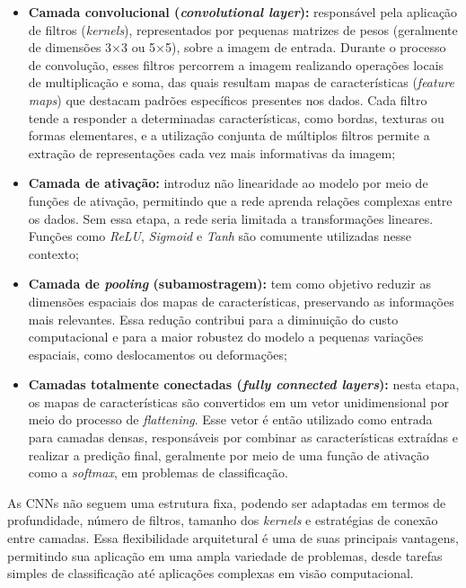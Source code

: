 \begin{itemize}
    
    \item \textbf{Camada convolucional (\textit{convolutional layer}):} responsável pela aplicação de filtros (\textit{kernels}), representados por pequenas matrizes de pesos (geralmente de dimensões 3×3 ou 5×5), sobre a imagem de entrada. Durante o processo de convolução, esses filtros percorrem a imagem realizando operações locais de multiplicação e soma, das quais resultam mapas de características (\textit{feature maps}) que destacam padrões específicos presentes nos dados. Cada filtro tende a responder a determinadas características, como bordas, texturas ou formas elementares, e a utilização conjunta de múltiplos filtros permite a extração de representações cada vez mais informativas da imagem;
    
    \item \textbf{Camada de ativação:} introduz não linearidade ao modelo por meio de funções de ativação, permitindo que a rede aprenda relações complexas entre os dados. Sem essa etapa, a rede seria limitada a transformações lineares. Funções como \textit{\acs{ReLU}}, \textit{Sigmoid} e \textit{Tanh} são comumente utilizadas nesse contexto;
    
    \item \textbf{Camada de \textit{pooling} (subamostragem):} tem como objetivo reduzir as dimensões espaciais dos mapas de características, preservando as informações mais relevantes. Essa redução contribui para a diminuição do custo computacional e para a maior robustez do modelo a pequenas variações espaciais, como deslocamentos ou deformações;
    
    \item \textbf{Camadas totalmente conectadas (\textit{fully connected layers}):} nesta etapa, os mapas de características são convertidos em um vetor unidimensional por meio do processo de \textit{flattening}. Esse vetor é então utilizado como entrada para camadas densas, responsáveis por combinar as características extraídas e realizar a predição final, geralmente por meio de uma função de ativação como a \textit{softmax}, em problemas de classificação.

\end{itemize}

As \acsp{CNN} não seguem uma estrutura fixa, podendo ser adaptadas em termos de profundidade, número de filtros, tamanho dos \textit{kernels} e estratégias de conexão entre camadas. Essa flexibilidade arquitetural é uma de suas principais vantagens, permitindo sua aplicação em uma ampla variedade de problemas, desde tarefas simples de classificação até aplicações complexas em visão computacional.

